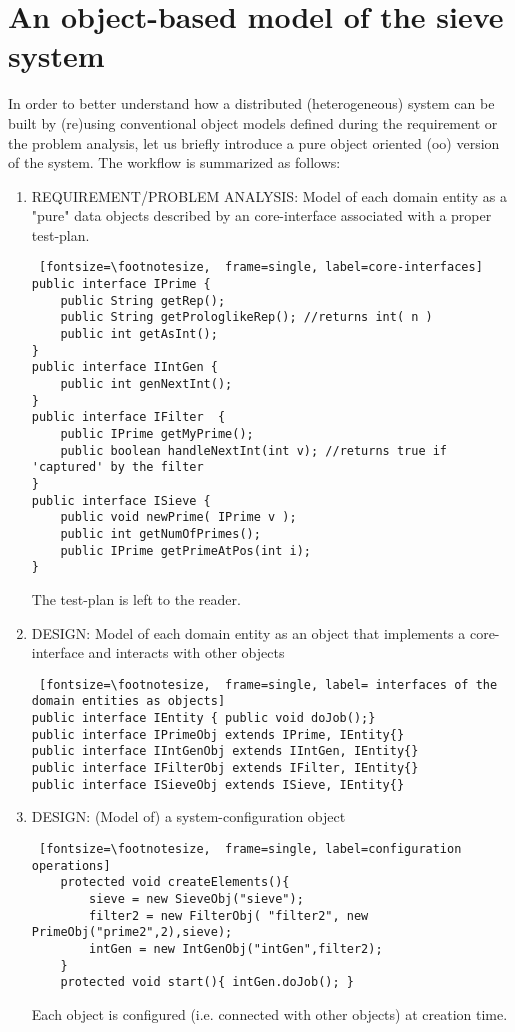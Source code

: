 \documentclass{../llncs}
\begin{document}
\newpage
\section{An object-based model of the sieve system}
In order to better understand how a distributed (heterogeneous) system can be built by (re)using conventional object models defined during the requirement or the problem analysis, let us briefly introduce a pure object oriented (oo) version of the system.
%
The workflow is summarized as follows:
\begin{enumerate}
\item REQUIREMENT/PROBLEM ANALYSIS: Model of each domain entity as a "pure" data objects described by an core-interface associated with a proper test-plan.

\medskip 
\begin{Verbatim} [fontsize=\footnotesize,  frame=single, label=core-interfaces]
public interface IPrime {
	public String getRep();
	public String getProloglikeRep(); //returns int( n )  
	public int getAsInt();
}
public interface IIntGen {
 	public int genNextInt(); 	
}
public interface IFilter  {
	public IPrime getMyPrime();
	public boolean handleNextInt(int v); //returns true if 'captured' by the filter
}
public interface ISieve {
	public void newPrime( IPrime v );
	public int getNumOfPrimes();
	public IPrime getPrimeAtPos(int i);
}
\end{Verbatim}

The test-plan is left to the reader.

\item DESIGN: Model of each domain entity as an object that implements a core-interface and interacts with other objects

\medskip
\begin{Verbatim} [fontsize=\footnotesize,  frame=single, label= interfaces of the domain entities as objects]
public interface IEntity { public void doJob();}
public interface IPrimeObj extends IPrime, IEntity{} 
public interface IIntGenObj extends IIntGen, IEntity{}
public interface IFilterObj extends IFilter, IEntity{}
public interface ISieveObj extends ISieve, IEntity{}
\end{Verbatim}

\item DESIGN: (Model of) a system-configuration object

\medskip
\begin{Verbatim} [fontsize=\footnotesize,  frame=single, label=configuration operations]
	protected void createElements(){
 		sieve = new SieveObj("sieve");
		filter2 = new FilterObj( "filter2", new PrimeObj("prime2",2),sieve);
		intGen = new IntGenObj("intGen",filter2);
	}
	protected void start(){ intGen.doJob();	}	
\end{Verbatim}
Each object is configured (i.e. connected with other objects) at creation time.
\end{enumerate}
\end{document}
